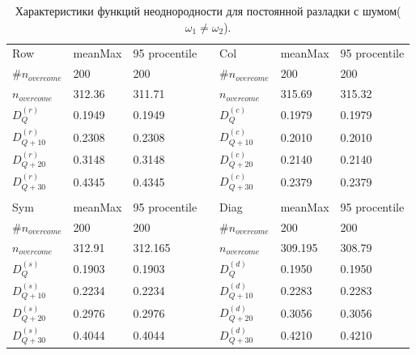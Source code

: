 \documentclass[specialist, substylefile = spbu.rtx,
			   subf, href, 12pt]{disser}
\begin{document}
\newpage
\begin{table}[!hhh]
	\caption{Характеристики функций неоднородности для постоянной разладки с шумом($\omega_1 \neq \omega_2$).}
	\begin{tabular}{lllllll}
		Row & meanMax & 95 procentile &  & Col & meanMax & 95 procentile \\
		$\#n_{overcome}$ & 200 & 200 &  & $\#n_{overcome}$ & 200 & 200 \\
		$n_{overcome}$ & 312.36 & 311.71 &  & $n_{overcome}$ & 315.69 & 315.32 \\
		$D_Q^{(r)}$ & 0.1949 & 0.1949 &  & $D_Q^{(c)}$ & 0.1979 & 0.1979 \\
		$D_{Q+10}^{(r)}$ & 0.2308 & 0.2308 &  & $D_{Q+10}^{(c)}$ & 0.2010 & 0.2010 \\
		$D_{Q+20}^{(r)}$ & 0.3148 & 0.3148 &  & $D_{Q+20}^{(c)}$ & 0.2140 & 0.2140 \\
		$D_{Q+30}^{(r)}$ & 0.4345 & 0.4345 &  & $D_{Q+30}^{(c)}$ & 0.2379 & 0.2379 \\
		&  &  &  &  &  &  \\
		Sym & meanMax & 95 procentile &  & Diag & meanMax & 95 procentile \\
		$\#n_{overcome}$ & 200 & 200 &  & $\#n_{overcome}$ & 200 & 200 \\
		$n_{overcome}$ & 312.91 & 312.165 &  & $n_{overcome}$ & 309.195 & 308.79 \\
		$D_Q^{(s)}$ & 0.1903 & 0.1903 &  & $D_Q^{(d)}$ & 0.1950 & 0.1950 \\
		$D_{Q+10}^{(s)}$ & 0.2234 & 0.2234 &  & $D_{Q+10}^{(d)}$ & 0.2283 & 0.2283 \\
		$D_{Q+20}^{(s)}$ & 0.2976 & 0.2976 &  & $D_{Q+20}^{(d)}$ & 0.3056 & 0.3056 \\
		$D_{Q+30}^{(s)}$ & 0.4044 & 0.4044 &  & $D_{Q+30}^{(d)}$ & 0.4210 & 0.4210
	\end{tabular}
	\label{tab:PermanentNoisedHeterogeneity}
\end{table}
\end{document}
